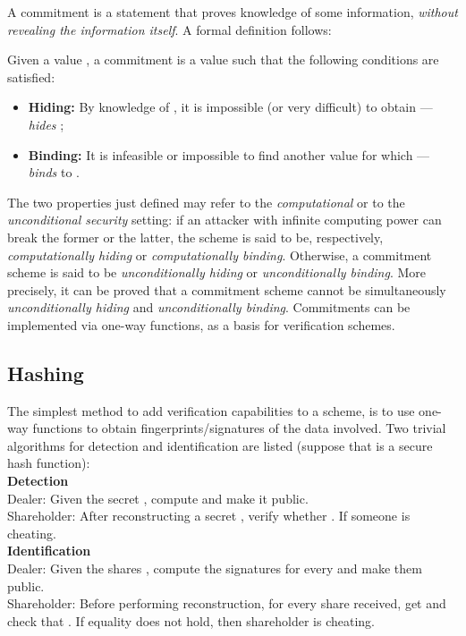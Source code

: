 \documentclass[10pt,journal,cspaper,compsoc]{IEEEtran}
\begin{document}
A commitment  \cite{Blum1983} is a statement that proves knowledge of some information, \emph{without revealing the information itself}. 
A formal definition follows:

\begin{defn}[Commitment]
Given a value , a commitment  is a value such that the following conditions are satisfied:
\begin{itemize}
\item \textbf{Hiding:} By knowledge of , it is impossible (or very difficult) to obtain  ---  \emph{hides} ;
\item \textbf{Binding:} It is infeasible or impossible to find another value  for which  ---  \emph{binds} to .
\end{itemize}
\end{defn}

The two properties just defined may refer to the \emph{computational} or to the \emph{unconditional security} setting: if an attacker with infinite computing power can break the former or the latter, the scheme is said to be, respectively, \emph{computationally hiding} or \emph{computationally binding}. Otherwise, a commitment scheme is said to be \emph{unconditionally hiding} or \emph{unconditionally binding}. More precisely, it can be proved \cite{books/sp/DelfsK02} that a commitment scheme cannot be simultaneously \emph{unconditionally hiding} and \emph{unconditionally binding}. Commitments can be implemented via one-way functions, as a basis for verification schemes.

\subsection{Hashing}
The simplest method to add verification capabilities to a scheme, is to use one-way functions to obtain fingerprints/signatures
of the data involved.
Two trivial algorithms for detection and identification are listed (suppose that  is a secure hash function):\\

\textbf{Detection}\\
Dealer: Given the secret , compute  and make it public.\\
Shareholder: After reconstructing a secret , verify whether . If  someone is cheating.\\

\textbf{Identification}\\
Dealer: Given the shares , compute the signatures  for every  and make them public.\\
Shareholder: Before performing reconstruction, for every share  received, get  and check that . If equality
does not hold, then shareholder  is cheating.
\end{document}
